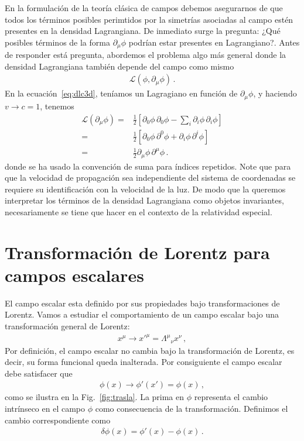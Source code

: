 En la formulación de la teoría clásica de campos debemos asegurarnos de que todos los términos posibles perimtidos por la simetrías asociadas al campo estén presentes en la densidad Lagrangiana. De inmediato surge la pregunta: ¿Qué posibles términos de la forma $\partial_{\mu}\phi$ podrían estar presentes en Lagrangiano?. Antes de responder está pregunta, abordemos el problema algo más general donde la densidad Lagrangiana también depende del campo como mismo
\begin{align*}
  \mathcal{L}(\phi,\partial_\mu \phi)\,.
\end{align*}
En la ecuación~\eqref{eq:dlc3d}, teníamos un Lagragiano en función de $\partial_{\mu}\phi$, y haciendo $v\to c=1$, tenemos
\begin{align}
\label{eq:Lpr}
  \mathcal{L}(\partial_{\mu}\phi)
    =&\frac{1}{2}\left[
      {\partial_0\phi}\,{\partial_0\phi}-\sum_i{\partial_i\phi}\,{\partial_i\phi}
   \right]\nonumber\\
    =&\frac{1}{2}\left[
      {\partial_0\phi}\,{\partial^0\phi}+{\partial_i\phi}\,{\partial^i\phi}
   \right]\nonumber\\
   =&\frac{1}{2}{\partial_\mu\phi}\,{\partial^\mu\phi}\,.
\end{align}
donde se ha usado la convención de suma para índices repetidos. Note que para que la velocidad de propagación sea independiente del sistema de coordenadas se requiere su identificación con la velocidad de la luz. De modo que la queremos interpretar los términos de la densidad Lagrangiana como objetos invariantes, necesariamente se tiene que hacer en el contexto de la relatividad especial.




\section{Transformación de Lorentz para campos escalares}

El campo escalar esta definido por sus propiedades bajo transformaciones de Lorentz. Vamos a estudiar el comportamiento de un campo escalar bajo una transformación general de Lorentz:
\begin{align}
\label{eq:179qft}
  x^\mu\to {x'}^\mu={\Lambda^\mu}_\nu x^\nu\,,
\end{align}
Por definición, el campo escalar no cambia bajo la transformación de Lorentz, es decir, su forma funcional queda inalterada. Por consiguiente el campo escalar debe satisfacer que
\begin{align}
 \phi(x)\to  \phi'(x')=\phi(x)\,,
\end{align}
como se ilustra en la Fig.~\ref{fig:trasla}. La prima en $\phi$ representa el cambio intrínseco en el campo $\phi$ como consecuencia de la transformación. Definimos el cambio correspondiente como
\begin{align}
  \delta \phi(x)=\phi'(x)-\phi(x)\,.
\end{align}







